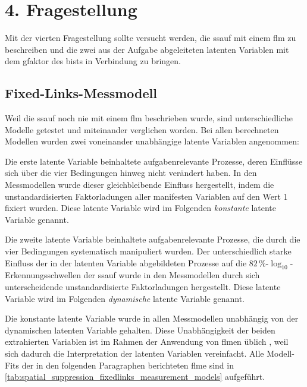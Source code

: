 \documentclass[11pt, twoside, a4paper]{book}		%
\begin{document}
\section{4. Fragestellung \label{sec:4Fragestellung}}

Mit der vierten Fragestellung sollte versucht werden, die \gls{ssauf} mit einem \gls{flm} zu beschreiben und die zwei aus der Aufgabe abgeleiteten latenten Variablen mit dem \gls{gfaktor} des \gls{bist}s in Verbindung zu bringen.


\subsection{Fixed-Links-Messmodell \label{subsec:spatial_suppression_fixed_links_messmodell}}

Weil die \gls{ssauf} noch nie mit einem \gls{flm} beschrieben wurde, sind unterschiedliche Modelle getestet und miteinander verglichen worden. Bei allen berechneten Modellen wurden zwei voneinander unabhängige latente Variablen angenommen: 

Die erste latente Variable beinhaltete aufgabenrelevante Prozesse, deren Einflüsse sich über die vier Bedingungen hinweg nicht verändert haben. In den Messmodellen wurde dieser gleichbleibende Einfluss hergestellt, indem die unstandardisierten Faktorladungen aller manifesten Variablen auf den Wert 1 fixiert wurden. Diese latente Variable wird im Folgenden \textit{konstante} latente Variable genannt. 

Die zweite latente Variable beinhaltete aufgabenrelevante Prozesse, die durch die vier Bedingungen systematisch manipuliert wurden. Der unterschiedlich starke Einfluss der in der latenten Variable abgebildeten Prozesse auf die $82\,\%$-$\log_{10}$-Er\-ken\-nungs\-schwel\-len der \gls{ssauf} wurde in den Messmodellen durch sich unterscheidende unstandardisierte Faktorladungen hergestellt. Diese latente Variable wird im Folgenden \textit{dynamische} latente Variable genannt.

Die konstante latente Variable wurde in allen Messmodellen unabhängig von der dynamischen latenten Variable gehalten. Diese Unabhängigkeit der beiden extrahierten Variablen ist im Rahmen der Anwendung von \gls{flm}en üblich \citep[z.B.][]{Wagner2014, Schweizer2007, Wang2015}, weil sich dadurch die Interpretation der latenten Variablen vereinfacht.
Alle Modell-Fits der in den folgenden Paragraphen berichteten \gls{flm}e sind in \autoref{tab:spatial_suppression_fixedlinks_measurement_models} aufgeführt.
\end{document}
